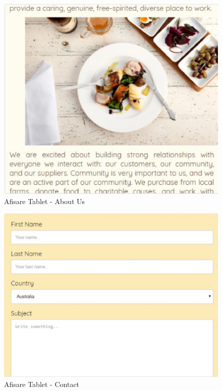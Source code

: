 \documentclass[11pt]{article}
\begin{document}
\begin{figure}[h]
\includegraphics{images/131.eps}
\caption{Afisare Tablet - About Us}
\end{figure}

\begin{figure}[h]
\includegraphics{images/14.eps}
\caption{Afisare Tablet - Contact}
\end{figure}
\end{document}
